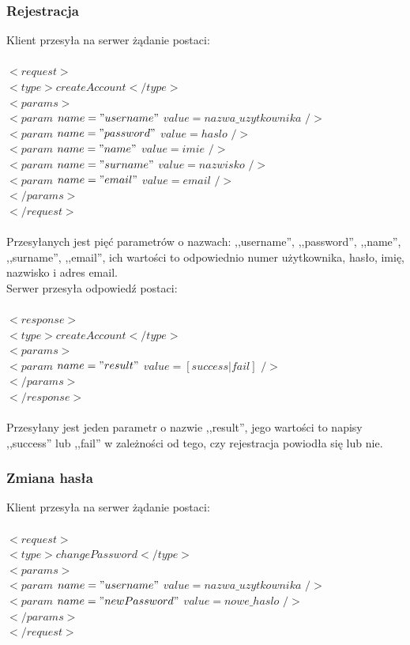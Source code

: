 \documentclass[a4paper,12pt]{article}
\begin{document}
\subsubsection[Rejestracja]{Rejestracja}
Klient przesyła na serwer żądanie postaci:\\\\
\noindent  $<request>$\\
\indent    $<type>createAccount</type>$\\
\indent    $<params>$\\
\indent \indent $<param$ $name="username"$ $value=nazwa\_uzytkownika$ $/>$\\
\indent \indent $<param$ $name="password"$ $value=haslo$ $/>$\\
\indent \indent $<param$ $name="name"$ $value=imie$ $/>$\\
\indent \indent $<param$ $name="surname"$ $value=nazwisko$ $/>$\\
\indent \indent $<param$ $name="email"$ $value=email$ $/>$\\
\indent    $</params>$\\
$</request>$\\\\

\noindent Przesyłanych jest pięć parametrów o nazwach: ,,username'', ,,password'', ,,name'', ,,surname'', ,,email'', ich wartości to odpowiednio numer użytkownika, hasło, imię, nazwisko i adres email.\\
Serwer przesyła odpowiedź postaci:\\\\
\noindent  $<response>$\\
\indent    $<type>createAccount</type>$\\
\indent    $<params>$\\
\indent \indent $<param$ $name="result"$ $value=[success|fail]$ $/>$\\
\indent    $</params>$\\
$</response>$\\\\
\noindent Przesyłany jest jeden parametr o nazwie ,,result'', jego wartości to napisy ,,success'' lub ,,fail'' w zależności od tego, czy rejestracja powiodła się lub nie.

\subsubsection[Zmiana hasła]{Zmiana hasła}
Klient przesyła na serwer żądanie postaci:\\\\
\noindent  $<request>$\\
\indent    $<type>changePassword</type>$\\
\indent    $<params>$\\
\indent \indent $<param$ $name="username"$ $value=nazwa\_uzytkownika$ $/>$\\
\indent \indent $<param$ $name="newPassword"$ $value=nowe\_haslo$ $/>$\\
\indent    $</params>$\\
$</request>$\\\\
\end{document}
